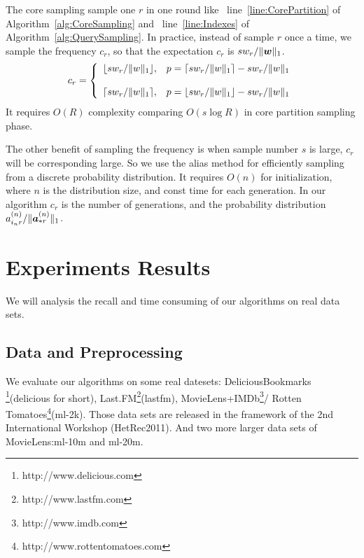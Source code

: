 \documentclass[letterpaper]{article}
\newcommand{\Sca}[3]{{#1}^{(#2)}_{i_#2#3}}%
\newcommand{\V}[1]{{\bm{{\MakeLowercase{#1}}}}}
\newcommand{\VnC}[3]{\V{#1}^{(#2)}_{#3}}
\newcommand{\Nrocl}[2]{\norm{\VnC{a}{#1}{*#2}}{1}}
\newcommand{\norm}[2]{\|#1\|_{#2}}
\newcommand{\AlgLine}[2]{line~\ref{line:#2} of Algorithm~\ref{alg:#1}}
\begin{document}
The core sampling sample one $r$ in one round like
~\AlgLine{CoreSampling}{CorePartition} and ~\AlgLine{QuerySampling}{Indexes}.
In practice, instead of sample $r$ once a time,
we sample the frequency $c_r$,
so that the expectation $c_r$ is $sw_r/\norm{\V{w}}{1}$.
\begin{equation*}c_r=
    \left\{
      \begin{array}{ll}
        \lfloor sw_r/\norm{w}{1} \rfloor,
        & \hbox{$p=\lceil sw_r/\norm{w}{1} \rceil - sw_r/\norm{w}{1}$} \\\\
        \lceil sw_r/\norm{w}{1} \rceil,
        & \hbox{$p=\lfloor sw_r/\norm{w}{1} \rfloor - sw_r/\norm{w}{1}$}
      \end{array}
    \right.
\end{equation*}
It requires $O(R)$ complexity comparing $O(s\log{R})$ in core partition sampling phase.

The other benefit of sampling the frequency is when sample number $s$ is large,
$c_r$ will be corresponding large.
So we use the alias method\cite{Vose91}
for efficiently sampling from a discrete probability distribution.
It requires $O(n)$ for initialization, where $n$ is the distribution size, and
const time for each generation.
In our algorithm $c_r$ is the number of generations,
and the probability distribution ${\Sca{a}{n}{r}}/\Nrocl{n}{r}$.

\section{Experiments Results}
We will analysis the recall and time consuming of our algorithms on real data sets.
\subsection{Data and Preprocessing}
We evaluate our algorithms on some real datesets:
DeliciousBookmarks
\footnote{http://www.delicious.com}(delicious for short),
Last.FM\footnote{http://www.lastfm.com}(lastfm),
MovieLens+IMDb\footnote{http://www.imdb.com }/
Rotten Tomatoes\footnote{http://www.rottentomatoes.com}(ml-2k).
Those data sets are released in the framework of the 2nd International Workshop (HetRec2011).
And two more larger data sets of MovieLens\cite{Harper2015}:ml-10m and ml-20m.
\end{document}
